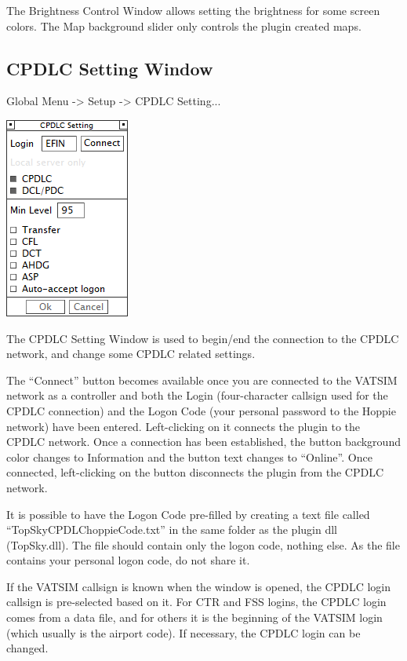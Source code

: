 \documentclass[11pt,a4paper,oldfontcommands]{memoir}
\newenvironment{Note}
  {\begin{shaded}\marginnote{\fbox{Note}}}
  {\end{shaded}}
\begin{document}
The Brightness Control Window allows setting the brightness for some screen colors. The Map background slider only controls the plugin created maps.

\subsection{CPDLC Setting Window}
\label{win:dls}

Global Menu -> Setup -> CPDLC Setting...

\includegraphics{img/dlsetup.png}

The CPDLC Setting Window is used to begin/end the connection to the CPDLC network, and change some CPDLC related settings.

The “Connect” button becomes available once you are connected to the VATSIM network as a controller and both the Login (four-character callsign used for the CPDLC connection) and the Logon Code (your personal password to the Hoppie network) have been entered. Left-clicking on it connects the plugin to the CPDLC network. Once a connection has been established, the button background color changes to Information and the button text changes to “Online”. Once connected, left-clicking on the button disconnects the plugin from the CPDLC network.

\begin{Note}
    It is possible to have the Logon Code pre-filled by creating a text file called “TopSkyCPDLChoppieCode.txt” in the same folder as the plugin dll (TopSky.dll). The file should contain only the logon code, nothing else. As the file contains your personal logon code, do not share it.
\end{Note}

If the VATSIM callsign is known when the window is opened, the CPDLC login callsign is pre-selected based on it. For CTR and FSS logins, the CPDLC login comes from a data file, and for others it is the beginning of the VATSIM login (which usually is the airport code). If necessary, the CPDLC login can be changed.
\end{document}

